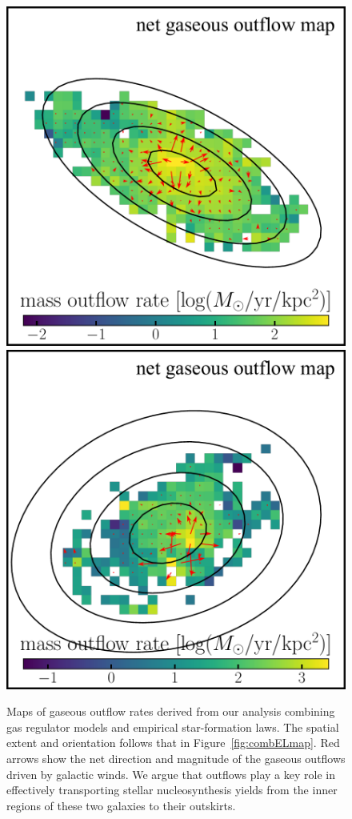 \begin{figure}
    \includegraphics[width=.5\textwidth]{fig/outmass_ID03751.pdf}
    \includegraphics[width=.5\textwidth]{fig/outmass_ID01203.pdf}
    \caption[First ever maps of gaseous outflow rates at $z$$\sim$2.]
    {Maps of gaseous outflow rates derived from our analysis combining gas regulator models and empirical star-formation laws.
    The spatial extent and orientation follows that in Figure~\ref{fig:combELmap}.
    Red arrows show the net direction and magnitude of the gaseous outflows driven by galactic winds.
    We argue that outflows play a key role in effectively transporting stellar nucleosynthesis yields from the inner regions of 
    these two galaxies to their outskirts.
    \label{fig:outmass}}
\end{figure}

